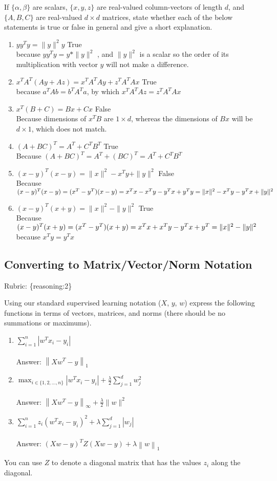 \documentclass{article}
\def\rubric#1{\gre{Rubric: \{#1\}}}{}
\def\blu#1{{\color{blu}#1}}
\def\gre#1{{\color{gre}#1}}
\def\norm#1{\|#1\|}
\def\enum#1{\begin{enumerate}#1\end{enumerate}}
\begin{document}
If $\{\alpha,\beta\}$ are scalars, $\{x,y,z\}$ are real-valued column-vectors of length $d$,
and $\{A,B,C\}$ are real-valued $d\times d$ matrices, \blu{state whether each of the below statements is true or false in general
and give a short explanation.}
\enum{
\addtocounter{enumi}{6}
\item $yy^Ty = \norm{y}^2y$ \blu{True} \\because $yy^Ty = y*\norm{y}^2$ , and $\norm{y}^2$ is a scalar so the order of its multiplication with vector $y$ will not make a difference.
\item $x^TA^T(Ay + Az) = x^TA^TAy + z^TA^TAx$ \blu{True} \\because $a^TAb = b^TA^Ta$, by which $x^TA^TAz = z^TA^TAx$
\item $x^T(B + C) = Bx + Cx$ \blu{False} \\
Because dimensions of $x^TB$ are $1\times d$, whereas the dimensions of $Bx$ will be $d\times1$, which does not match. 
\item $(A + BC)^T = A^T + C^TB^T$ \blu{True}\\
Because $(A + BC)^T = A^T + (BC)^T = A^T+C^TB^T$
\item $(x-y)^T(x-y) = \norm{x}^2 - x^Ty + \norm{y}^2$ \blu{False} \\
Because $(x-y)^T(x-y) = (x^T - y^T)(x-y) = x^Tx - x^Ty - y^Tx +y^Ty \\= \norm{x}^2 - x^Ty - y^Tx + \norm{y}^2$
\item $(x-y)^T(x+y) = \norm{x}^2 - \norm{y}^2$ \blu{True} \\ 
Because $(x-y)^T(x+y) = (x^T-y^T)(x+y) \\= x^Tx + x^Ty - y^Tx + y^T \\= \norm{x}^2 - \norm{y}^2$ because $x^Ty = y^Tx$
}

\subsection{Converting to Matrix/Vector/Norm Notation}
\rubric{reasoning:2}

Using our standard supervised learning notation ($X$, $y$, $w$)
express the following functions in terms of vectors, matrices, and norms (there should be no summations or maximums).
\enum{
\item $\sum_{i=1}^n |w^Tx_i - y_i|$ \\ \\
\blu{Answer:}  $\left \| Xw^T - y \right \|_{1}$
\item $\max_{i \in \{1,2,\dots,n\}} |w^Tx_i  - y_i| + \frac{\lambda}{2}\sum_{j=1}^d w_j^2 $  \\ \\
\blu{Answer:} $ \left \| Xw^T - y \right \|_{\infty} + \frac{\lambda}{2}\norm{w}^2 $
\item $\sum_{i=1}^n z_i (w^Tx_i - y_i)^2 + \lambda \sum_{j=1}^{d} |w_j|$ \\ \\
\blu{Answer:} $(Xw - y)^TZ(Xw -y) + \lambda \left \| w \right \|_{1}$ 
}
You can use $Z$ to denote a diagonal matrix that has the values $z_i$ along the diagonal.
\end{document}
